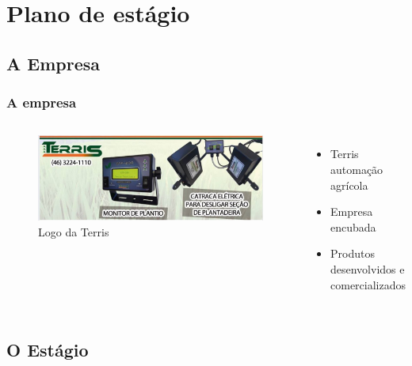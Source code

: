 
\section{Plano de estágio}

\subsection{A Empresa}

\begin{frame}%
\frametitle{A empresa}
\begin{columns}

	\begin{figure}[]
	 \centering
	 \captionsetup{width=\textwidth,font=footnotesize,textfont=bf}
	 \includegraphics[width=\textwidth,keepaspectratio]{Figuras/Terris.jpg}
	 \caption{Logo da Terris}
	\end{figure}
	
	\begin{itemize}
	\item Terris automação agrícola
	\pause
	\item Empresa encubada
	\pause
	\item Produtos desenvolvidos e comercializados
	\end{itemize}

\end{columns}
\end{frame}

\subsection{O Estágio}

